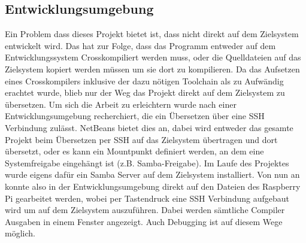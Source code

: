 \subsection{Entwicklungsumgebung}
Ein Problem dass dieses Projekt bietet ist, dass nicht direkt auf dem Zielsystem entwickelt wird. Das hat zur Folge, dass das Programm entweder auf dem Entwicklungssystem Crosskompiliert werden muss, oder die Quelldateien auf das Zielsystem kopiert werden müssen um sie dort zu kompilieren. Da das Aufsetzen eines Crosskompilers inklusive der dazu nötigen Toolchain als zu Aufwändig erachtet wurde, blieb nur der Weg das Projekt direkt auf dem Zielsystem zu übersetzen. Um sich die Arbeit zu erleichtern wurde nach einer Entwicklungsumgebung recherchiert, die ein Übersetzen über eine SSH Verbindung zulässt. NetBeans bietet dies an, dabei wird entweder das gesamte Projekt beim Übersetzen per SSH auf das Zielsystem übertragen und dort übersetzt, oder es kann ein Mountpunkt definiert werden, an dem eine Systemfreigabe eingehängt ist (z.B. Samba-Freigabe). Im Laufe des Projektes wurde eigens dafür ein Samba Server auf dem Zielsystem installiert. Von nun an konnte also in der Entwicklungsumgebung direkt auf den Dateien des Raspberry Pi gearbeitet werden, wobei per Tastendruck eine SSH Verbindung aufgebaut wird um auf dem Zielsystem  auszuführen. Dabei werden sämtliche Compiler Ausgaben in einem Fenster angezeigt. Auch Debugging ist auf diesem Wege möglich.

